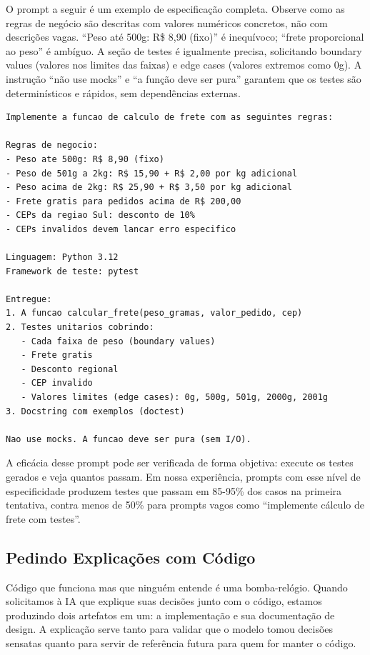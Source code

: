 O prompt a seguir é um exemplo de especificação completa. Observe como as regras
de negócio são descritas com valores numéricos concretos, não com descrições
vagas. ``Peso até 500g: R\$ 8,90 (fixo)'' é inequívoco; ``frete proporcional ao
peso'' é ambíguo. A seção de testes é igualmente precisa, solicitando boundary
values (valores nos limites das faixas) e edge cases (valores extremos como 0g).
A instrução ``não use mocks'' e ``a função deve ser pura'' garantem que os testes
são determinísticos e rápidos, sem dependências externas.

\begin{lstlisting}[language={}, caption={Prompt para geração de código com testes}]
Implemente a funcao de calculo de frete com as seguintes regras:

Regras de negocio:
- Peso ate 500g: R$ 8,90 (fixo)
- Peso de 501g a 2kg: R$ 15,90 + R$ 2,00 por kg adicional
- Peso acima de 2kg: R$ 25,90 + R$ 3,50 por kg adicional
- Frete gratis para pedidos acima de R$ 200,00
- CEPs da regiao Sul: desconto de 10%
- CEPs invalidos devem lancar erro especifico

Linguagem: Python 3.12
Framework de teste: pytest

Entregue:
1. A funcao calcular_frete(peso_gramas, valor_pedido, cep)
2. Testes unitarios cobrindo:
   - Cada faixa de peso (boundary values)
   - Frete gratis
   - Desconto regional
   - CEP invalido
   - Valores limites (edge cases): 0g, 500g, 501g, 2000g, 2001g
3. Docstring com exemplos (doctest)

Nao use mocks. A funcao deve ser pura (sem I/O).
\end{lstlisting}

A eficácia desse prompt pode ser verificada de forma objetiva: execute os testes
gerados e veja quantos passam. Em nossa experiência, prompts com esse nível de
especificidade produzem testes que passam em 85-95\% dos casos na primeira
tentativa, contra menos de 50\% para prompts vagos como ``implemente cálculo de
frete com testes''.

\subsection{Pedindo Explicações com Código}

Código que funciona mas que ninguém entende é uma bomba-relógio. Quando solicitamos
à IA que explique suas decisões junto com o código, estamos produzindo dois
artefatos em um: a implementação e sua documentação de design. A explicação serve
tanto para validar que o modelo tomou decisões sensatas quanto para servir de
referência futura para quem for manter o código.

